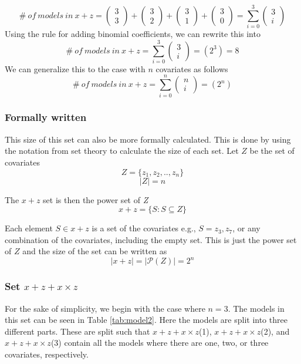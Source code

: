 \[\#\ of\ models\ in\ x + z = \left( \begin{array}{c}
3 \\ 
3 \end{array}
\right)+\left( \begin{array}{c}
3 \\ 
2 \end{array}
\right)+\left( \begin{array}{c}
3 \\ 
1 \end{array}
\right)+\left( \begin{array}{c}
3 \\ 
0 \end{array}
\right)=\sum^3_{i=0}{\left( \begin{array}{c}
3 \\ 
i \end{array}
\right)}\] 
Using the rule for adding binomial coefficients, we can rewrite this into
\[\#\ of\ models\ in\ x + z = \sum^3_{i=0}{\left( \begin{array}{c}
3 \\ 
i \end{array}
\right)}=\left(2^3\right)=8\] 
We can generalize this to the case with $n$ covariates  as follows 
\[\#\ of\ models\ in\ x + z = \sum^n_{i=0}{\left( \begin{array}{c}
n \\ 
i \end{array}
\right)}=\left(2^n\right)\] 

\subsubsection{Formally written} This size of this set can also be more formally calculated. This is done by using the notation from set theory to calculate the size of each set.
Let $Z$ be the set of covariates 
\[Z=\{\left.z_1,z_2,..,z_n\right.\}\] 
\[\left|Z\right|=n\] 


\noindent The $x + z$ set is then the power set of \emph{Z} 
\[x + z = \{\left.S:S\subseteq Z\right.\}\] 

Each element $S\in x + z$ is a set of the covariates e.g., $S=\left.z_3,z_7\right.$, or any combination of the covariates, including the empty set. This is just the power set of $Z$ and the size of the set can be written as
\[\left|x + z\right|=|\mathcal{P}\left(Z\right)|=2^n\] 


\subsubsection{Set $x + z + x \times z$}
For the sake of simplicity, we begin with the case where $n=3$. The models in this set can be seen in Table \ref{tab:model2}. Here the models are split into three different parts. These are split such that $x + z + x \times z$(1), $x + z + x \times z$(2), and $x + z + x \times z$(3) contain all the models where there are one, two, or three covariates, respectively.\\

